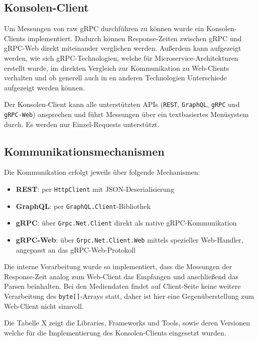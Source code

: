 \begin{enumerate}
	\subsection{Konsolen-Client}
	 Um Messungen von raw gRPC durchführen zu können wurde ein Konsolen-Clients implementiert. Dadurch können Response-Zeiten zwischen gRPC und gRPC-Web direkt miteinander verglichen werden. Außerdem kann aufgezeigt werden, wie sich gRPC-Technologien, welche für Microservice-Architekturen erstellt wurde, im direkten Vergleich zur Kommunikation zu Web-Clients verhalten und ob  generell auch in en anderen Technologien Unterschiede aufgezeigt werden können.
	
	Der Konsolen-Client kann alle unterstützten APIs (\texttt{REST}, \texttt{GraphQL}, \texttt{gRPC} und \texttt{gRPC-Web}) ansprechen und führt Messungen über ein textbasiertes Menüsystem durch.  
	Es werden nur Einzel-Requests unterstützt.
	
	\subsection*{Kommunikationsmechanismen}
	Die Kommunikation erfolgt jeweils über folgende Mechanismen:
	\begin{itemize}
		\item \textbf{REST}: per \texttt{HttpClient} mit JSON-Deserialisierung
		\item \textbf{GraphQL}: per \texttt{GraphQL.Client}-Bibliothek
		\item \textbf{gRPC}: über \texttt{Grpc.Net.Client} direkt als native gRPC-Kommunikation
		\item \textbf{gRPC-Web}: über \texttt{Grpc.Net.Client.Web} mittels spezieller Web-Handler, angepasst an das gRPC-Web-Protokoll
	\end{itemize}
	
	Die interne Verarbeitung wurde so implementiert, dass die Messungen der Response-Zeit analog zum Web-Client das Empfangen und anschließend das Parsen beinhalten.  
	Bei den Mediendaten findet auf Client-Seite keine weitere Verarbeitung des \texttt{byte[]}-Arrays statt, daher ist hier eine Gegenüberstellung zum Web-Client nicht sinnvoll.
	
	Die Tabelle X zeigt die Libraries, Frameworks und Tools, sowie deren Versionen welche für die Implementierung des Konsolen-Clients eingesetzt wurden.
	

\end{enumerate}
